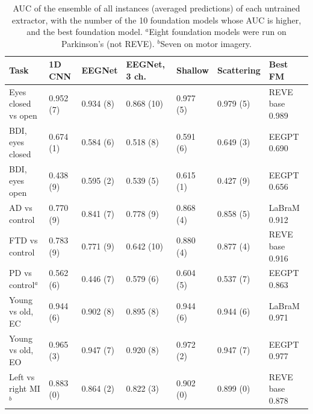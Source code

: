 \documentclass[11pt]{article}
\begin{document}
\begin{table}[h]
\centering\footnotesize\setlength{\tabcolsep}{3pt}
\caption{AUC of the ensemble of all instances (averaged predictions) of each untrained extractor,
with the number of the 10 foundation models whose AUC is higher, and the best foundation model.
$^a$Eight foundation models were run on Parkinson's (not REVE). $^b$Seven on motor imagery.}
\label{tab:fmpools}
\begin{tabular}{@{}lllllll@{}}
\toprule
Task & 1D CNN & EEGNet & EEGNet, 3 ch. & Shallow & Scattering & Best FM \\
\midrule
Eyes closed vs open & 0.952 (7) & 0.934 (8) & 0.868 (10) & 0.977 (5) & 0.979 (5) & REVE base 0.989 \\
BDI, eyes closed & 0.674 (1) & 0.584 (6) & 0.518 (8) & 0.591 (6) & 0.649 (3) & EEGPT 0.690 \\
BDI, eyes open & 0.438 (9) & 0.595 (2) & 0.539 (5) & 0.615 (1) & 0.427 (9) & EEGPT 0.656 \\
AD vs control & 0.770 (9) & 0.841 (7) & 0.778 (9) & 0.868 (4) & 0.858 (5) & LaBraM 0.912 \\
FTD vs control & 0.783 (9) & 0.771 (9) & 0.642 (10) & 0.880 (4) & 0.877 (4) & REVE base 0.916 \\
PD vs control$^a$ & 0.562 (6) & 0.446 (7) & 0.579 (6) & 0.604 (5) & 0.537 (7) & EEGPT 0.863 \\
Young vs old, EC & 0.944 (6) & 0.902 (8) & 0.895 (8) & 0.944 (6) & 0.944 (6) & LaBraM 0.971 \\
Young vs old, EO & 0.965 (3) & 0.947 (7) & 0.920 (8) & 0.972 (2) & 0.947 (7) & EEGPT 0.977 \\
Left vs right MI$^b$ & 0.883 (0) & 0.864 (2) & 0.822 (3) & 0.902 (0) & 0.899 (0) & REVE base 0.878 \\
\bottomrule
\end{tabular}
\end{table}
\end{document}
